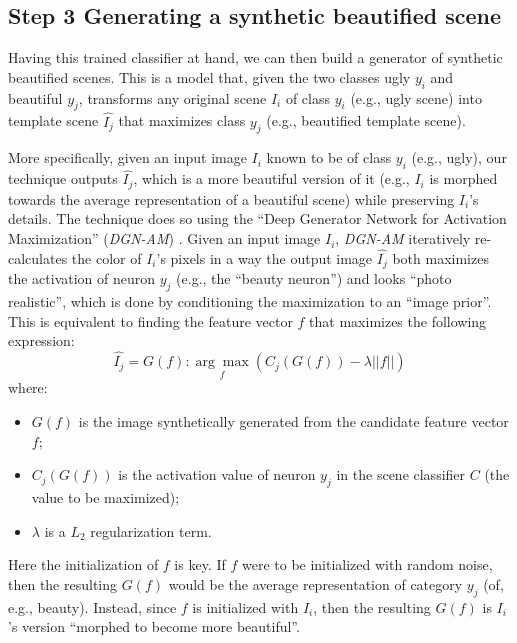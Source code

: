 \subsection*{Step 3 Generating a synthetic beautified scene}
Having this trained classifier at hand, we can then build a generator of synthetic beautified scenes. This is a model that, given the two classes ugly $y_i$ and beautiful $y_j$, transforms any original scene $I_i$ of class $y_i$ (e.g., ugly scene) into template scene $\hat{I_j}$ that maximizes class $y_j$ (e.g., beautified template scene). 

More specifically, given an input image $I_i$ known to be of class $y_i$  (e.g., ugly), our technique outputs  $\hat{I_j}$, which is a more beautiful version of it (e.g., $I_i$ is morphed  towards the average representation of a beautiful scene) while preserving $I_i$'s details. The technique does so using the ``Deep Generator Network for Activation Maximization'' (\emph{DGN-AM}) \cite{nguyen2016synthesizing}. Given an input image $I_i$, \emph{DGN-AM} iteratively re-calculates the color of $I_i$'s pixels in  a way  the output image $\hat{I_j}$  both maximizes  the  activation of neuron $y_j$ (e.g., the ``beauty neuron'') and looks ``photo realistic'',  which is done by conditioning the maximization to an ``image prior''. This is equivalent to finding the feature vector $f$ that maximizes the following expression:
\begin{equation}
\hat{I_j} =G( f ) : \underset{f}{\arg\max}(C_{j}(G(f))-\lambda||f||)
\end{equation}
where:
\begin{itemize}
\item $G(f)$ is the image synthetically generated from the candidate feature vector $f$;
\item $C_j(G(f))$ is the activation value of neuron $y_j$ in the scene classifier $C$ (the value to be maximized);
\item $\lambda$ is a $L_2$ regularization term.
\end{itemize}
Here the initialization of $f$ is key. If $f$ were to be initialized with random noise, then the resulting $G(f)$ would be the average representation of category $y_j$ (of, e.g., beauty). Instead, since $f$ is initialized with $I_i$, then the resulting $G(f)$ is $I_i$'s version ``morphed to become more beautiful''. 


